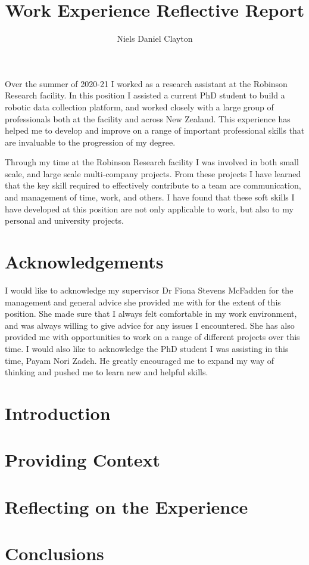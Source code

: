 \documentclass[11pt, a4paper, twoside, openright]{report}
\title{Work Experience Reflective Report}
\author{Niels Daniel Clayton}
\date{}
\begin{document}
\begin{summary}
    
    Over the summer of 2020-21 I worked as a research assistant at the Robinson Research facility. In this position I assisted a current PhD student to build a robotic data collection platform, and worked closely with a large group of professionals both at the facility and across New Zealand. This experience has helped me to develop and improve on a range of important professional skills that are invaluable to the progression of my degree.
    
    Through my time at the Robinson Research facility I was involved in both small scale, and large scale multi-company projects. From these projects I have learned that the key skill required to effectively contribute to a team are communication, and management of time, work, and others. I have found that these soft skills I have developed at this position are not only applicable to work, but also to my personal and university projects.   

\end{summary}

\frontmatter


\maketitle

\tableofcontents

\vfill

\section*{Acknowledgements}

I would like to acknowledge my supervisor Dr Fiona Stevens McFadden for the management and general advice she provided me with for the extent of this position. She made sure that I always felt comfortable in my work environment, and was always willing to give advice for any issues I encountered. She has also provided me with opportunities to work on a range of different projects over this time. I would also like to acknowledge the PhD student I was assisting in this time, Payam Nori Zadeh. He greatly encouraged me to expand my way of thinking and pushed me to learn new and helpful skills.  


\mainmatter


\section{Introduction}

\section{Providing Context}

\section{Reflecting on the Experience}

\section{Conclusions}
\end{document}
